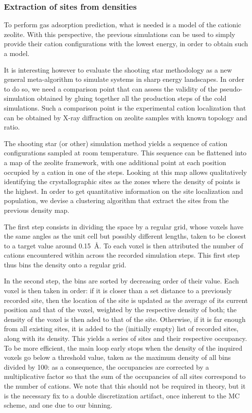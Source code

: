 \documentclass[main.tex]{subfiles}
\begin{document}
\subsubsection{Extraction of sites from densities}

To perform gas adsorption prediction, what is needed is a model of the cationic zeolite. With this perspective, the previous simulations can be used to simply provide their cation configurations with the lowest energy, in order to obtain such a model.

It is interesting however to evaluate the shooting star methodology as a new general meta-algorithm to simulate systems in sharp energy landscapes. In order to do so, we need a comparison point that can assess the validity of the pseudo-simulation obtained by gluing together all the production steps of the cold simulations. Such a comparison point is the experimental cation localization that can be obtained by X-ray diffraction on zeolite samples with known topology and \SiAl ratio.

The shooting star (or other) simulation method yields a sequence of cation configurations sampled at room temperature. This sequence can be flattened into a map of the zeolite framework, with one additional point at each position occupied by a cation in one of the steps. Looking at this map allows qualitatively identifying the crystallographic sites as the zones where the density of points is the highest. In order to get quantitative information on the site localization and population, we devise a clustering algorithm that extract the sites from the previous density map.

The first step consists in dividing the space by a regular grid, whose voxels have the same angles as the unit cell but possibly different lengths, taken to be closest to a target value around \qty{0.15}{\angstrom}. To each voxel is then attributed the number of cations encountered within across the recorded simulation steps. This first step thus bins the density onto a regular grid.

In the second step, the bins are sorted by decreasing order of their value. Each voxel is then taken in order: if it is closer than a set distance to a previously recorded site, then the location of the site is updated as the average of its current position and that of the voxel, weighted by the respective density of both; the density of the voxel is then aded to that of the site. Otherwise, if it is far enough from all existing sites, it is added to the (initially empty) list of recorded sites, along with its density. This yields a series of sites and their respective occupancy. To be more efficient, the main loop early stops when the density of the inquired voxels go below a threshold value, taken as the maximum density of all bins divided by 100: as a consequence, the occupancies are corrected by a multiplicative factor so that the sum of the occupancies of all sites correspond to the number of cations. We note that this should not be required in theory, but it is the necessary fix to a double discretization artifact, once inherent to the MC scheme, and one due to our binning.
\end{document}
